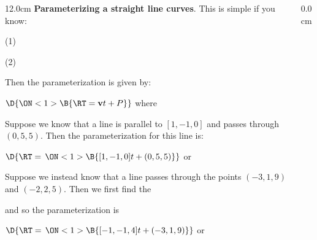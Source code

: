 \begin{frame}
{}
\scriptsize
\begin{columns}
\begin{column}{12.0cm}
{\bf Parameterizing a straight line curves}.  This is simple if you know: 

\vspace{0.2cm}

(1)  

\vspace{0.1cm}

(2) 

\vspace{0.4cm}

Then the parameterization is given by:

\vspace{0.2cm}

\begin{center}
	$\D{\ON<1>{\B{\RT = {\bf v} t + P}}}$ \quad where \quad 
	\ON<1>{\B{$t \in \RE$}}
\end{center}

\EX Suppose we know that a line is parallel to $[1,-1,0]$ and passes through $(0,5,5)$.  Then the parameterization for this line is:

\begin{center}
	$\D{\RT = \, 
	\ON<1>{\B{[1,-1,0] t + (0,5,5)}}}$ \quad or \quad 
	\ON<1>{\B{$\D{\RT = \, [t,-t+5,5]}$ \quad $t \in \RE$}}
\end{center}

\vspace{0.2cm}

\EX Suppose we instead know that a line passes through the points $(-3,1,9)$ and $(-2,2,5)$.  Then we first find the  

\begin{center}
\end{center}

and so the parameterization is

\begin{center}
	$\D{\RT = \, 
	\ON<1>{\B{[-1,-1,4] t + (-3,1,9)}}}$ \quad or \quad 
	\ON<1>{\B{$\D{\RT = \, [-t-3,-t+1,4t+9]}$ \quad $t \in \RE$}}
\end{center}

\end{column}
\begin{column}{0.0cm}\end{column}
\end{columns}
\end{frame}

